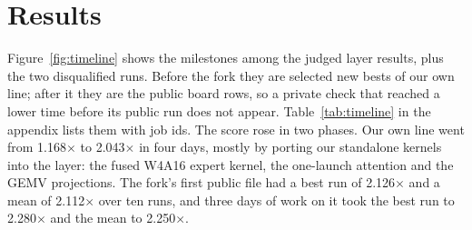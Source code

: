 \documentclass[11pt]{article}
\begin{document}
\section{Results}
\label{sec:results}

Figure~\ref{fig:timeline} shows the milestones among the judged layer results,
plus the two disqualified runs. Before the fork they are selected new bests of
our own line; after it they are the public board rows, so a private check that
reached a lower time before its public run does not appear.
Table~\ref{tab:timeline} in the appendix lists them with job ids. The score rose
in two phases. Our own line went from 1.168$\times$ to 2.043$\times$ in four days,
mostly by porting our standalone kernels into the layer: the fused W4A16 expert
kernel, the one-launch attention and the GEMV projections. The fork's first public
file had a best run of 2.126$\times$ and a mean of 2.112$\times$ over ten runs,
and three days of work on it took the best run to 2.280$\times$ and the mean to
2.250$\times$.
\end{document}
